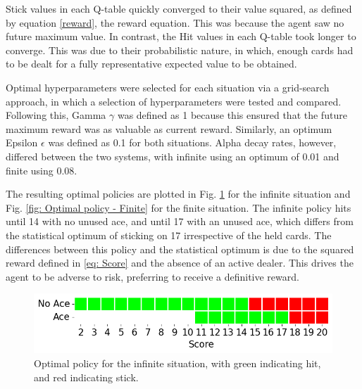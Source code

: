 Stick values in each Q-table quickly converged to their value squared, as defined by equation \ref{reward}, the reward equation. This was because the agent saw no future maximum value. In contrast, the Hit values in each Q-table took longer to converge. This was due to their probabilistic nature, in which, enough cards had to be dealt for a fully representative expected value to be obtained. 

Optimal hyperparameters were selected for each situation via a grid-search approach, in which a selection of hyperparameters were tested and compared. Following this, Gamma \(\gamma\) was defined as 1 because this ensured that the future maximum reward was as valuable as current reward. Similarly, an optimum Epsilon \(\epsilon\) was defined as 0.1 for both situations. Alpha decay rates, however, differed between the two systems, with infinite using an optimum of 0.01 and finite using 0.08. 

The resulting optimal policies are plotted in Fig. \ref{fig: Optimal policy - Infinite} for the infinite situation and Fig. \ref{fig: Optimal policy - Finite} for the finite situation. The infinite policy hits until 14 with no unused ace, and until 17 with an unused ace, which differs from the statistical optimum of sticking on 17 irrespective of the held cards. The differences between this policy and the statistical optimum is due to the squared reward defined in \ref{eq: Score} and the absence of an active dealer. This drives the agent to be adverse to risk, preferring to receive a definitive reward. 

\begin{figure}[h]
    \centering
    \includegraphics[width=\singlefigure]{figures/infinite_optimal_policy.png}
    \caption{Optimal policy for the infinite situation, with green indicating hit, and red indicating stick.}
    \label{fig: Optimal policy - Infinite} 
\end{figure}


